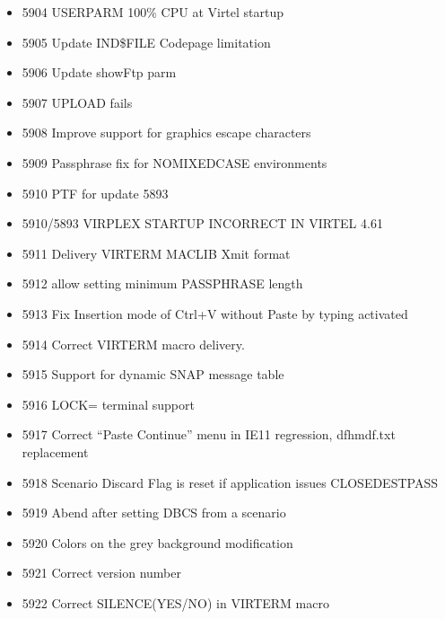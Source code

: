 \documentclass[letterpaper,10pt,english]{sphinxmanual}
\begin{document}
\begin{itemize}
\item {} 
5904 USERPARM 100\% CPU at Virtel startup

\item {} 
5905 Update IND\$FILE Codepage limitation

\item {} 
5906 Update showFtp parm

\item {} 
5907 UPLOAD fails

\item {} 
5908 Improve support for graphics escape characters

\item {} 
5909 Passphrase fix for NOMIXEDCASE environments

\item {} 
5910 PTF for update 5893

\item {} 
5910/5893 VIRPLEX STARTUP INCORRECT IN VIRTEL 4.61

\item {} 
5911 Delivery VIRTERM MACLIB Xmit format

\item {} 
5912 allow setting minimum PASSPHRASE length

\item {} 
5913 Fix Insertion mode of Ctrl+V without Paste by typing activated

\item {} 
5914 Correct VIRTERM macro delivery.

\item {} 
5915 Support for dynamic SNAP message table

\item {} 
5916 LOCK= terminal support

\item {} 
5917 Correct “Paste Continue” menu in IE11 regression, dfhmdf.txt replacement

\item {} 
5918 Scenario Discard Flag is reset if application issues CLOSEDESTPASS

\item {} 
5919 Abend after setting DBCS from a scenario

\item {} 
5920 Colors on the grey background modification

\item {} 
5921 Correct version number

\item {} 
5922 Correct SILENCE(YES/NO) in VIRTERM macro


\end{itemize}
\end{document}
